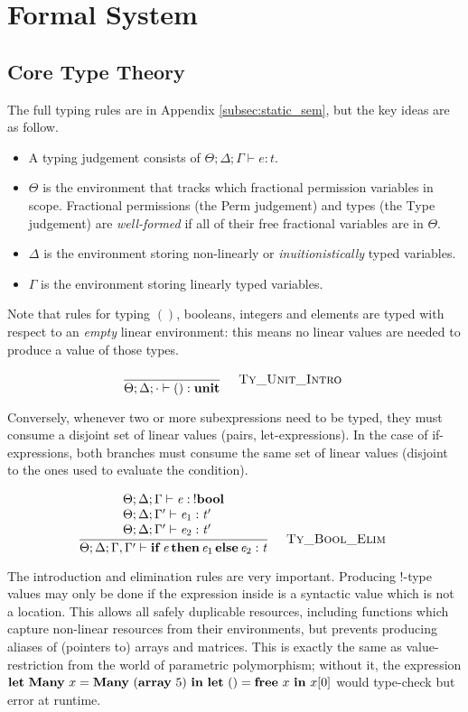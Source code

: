 \section{Formal System}\label{sec:formal_system}

\subsection{Core Type Theory}\label{subsec:core_tt}

The full typing rules are in Appendix \ref{subsec:static_sem}, but the key
ideas are as follow.

\begin{itemize}

    \item A typing judgement consists of $ \Theta; \Delta; \Gamma \vdash e : t$.

    \item $\Theta$ is the environment that tracks which fractional permission variables
        in scope. Fractional permissions (the \textsf{Perm} judgement) and types (the
        \textsf{Type} judgement) are \emph{well-formed} if all of their free fractional
        variables are in $\Theta$.

    \item $\Delta$ is the environment storing non-linearly or \emph{inuitionistically}
        typed variables.

    \item $\Gamma$ is the environment storing linearly typed variables.

\end{itemize}

Note that rules for typing $()$, booleans, integers and elements are typed
with respect to an \emph{empty} linear environment: this means no linear
values are needed to produce a value of those types.

\vspace{-\baselineskip}
\[
    {\displaystyle\frac{\begin{array}{l} \end{array}}{ \Theta ; \Delta ; \cdot \vdash ( ) : \mathbf{unit}}\quad\textsc{ {\textsc{Ty\_Unit\_Intro}}{} }}
\]

Conversely, whenever two or more subexpressions need to be typed, they must
consume a disjoint set of linear values (pairs, let-expressions).  In the case
of if-expressions, both branches must consume the same set of linear values
(disjoint to the ones used to evaluate the condition).

\vspace{-\baselineskip}
\[
    {\displaystyle\frac{\begin{array}{l} \Theta ; \Delta ; \Gamma \vdash \mathit{e} : \: ! \mathbf{bool} \\ \Theta ; \Delta ; \Gamma' \vdash \mathit{e_{{\mathrm{1}}}} : \mathit{t'} \\ \Theta ; \Delta ; \Gamma' \vdash \mathit{e_{{\mathrm{2}}}} : \mathit{t'} \\ \end{array}}{ \Theta ; \Delta ; \Gamma , \Gamma' \vdash \mathbf{if} \, \mathit{e} \, \mathbf{then} \, \mathit{e_{{\mathrm{1}}}} \, \mathbf{else} \, \mathit{e_{{\mathrm{2}}}} : \mathit{t}}\quad\textsc{ {\textsc{Ty\_Bool\_Elim}}{} }}
\]

The  introduction and elimination rules are very important.
Producing !-type values may only be done if the expression inside is a
syntactic value which is not a location. This allows all safely duplicable
resources, including functions which capture non-linear resources from their
environments, but prevents producing aliases of (pointers to) arrays and
matrices. This is exactly the same as value-restriction from the world of
parametric polymorphism; without it, the expression $\mathbf{let}\ \mathbf{Many}\ x = \mathbf{Many}\
(\mathbf{array}\ 5)\ \mathbf{in}\ \mathbf{let}\ () = \mathbf{free}\ x\ \mathbf{in}\ x[0]$ would
type-check but error at runtime.

